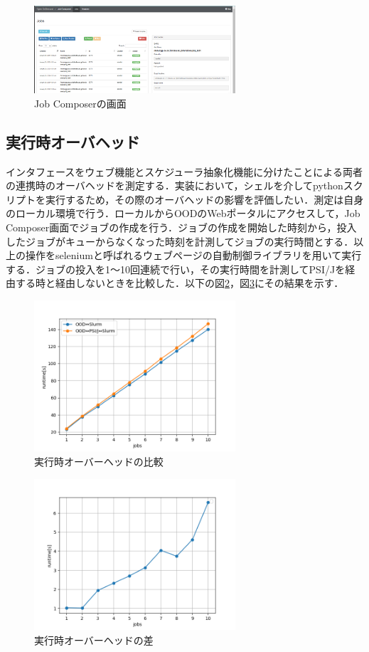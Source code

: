 \documentclass[a4paper,oneside,twocolumn,notitlepage,dvipdfmx]{jsarticle}
\begin{document}
\begin{figure}[h]
  \centering
  \includegraphics[width=75mm]{./fig/jobcomposer.png}
  \caption{Job Composerの画面}
  \label{fig4}
\end{figure}

\subsection{実行時オーバヘッド}
インタフェースをウェブ機能とスケジューラ抽象化機能に分けたことによる両者の連携時のオーバヘッドを測定する．実装において，シェルを介してpythonスクリプトを実行するため，その際のオーバヘッドの影響を評価したい．測定は自身のローカル環境で行う．ローカルからOODのWebポータルにアクセスして，Job Composer画面でジョブの作成を行う．ジョブの作成を開始した時刻から，投入したジョブがキューからなくなった時刻を計測してジョブの実行時間とする．以上の操作をseleniumと呼ばれるウェブページの自動制御ライブラリを用いて実行する．ジョブの投入を1～10回連続で行い，その実行時間を計測してPSI/Jを経由する時と経由しないときを比較した．以下の図\ref{fig2}，図\ref{fig3}にその結果を示す．\par

\begin{figure}[h]
  \centering
  \includegraphics[width=75mm]{./fig/ave_1-20.png}
  \caption{実行時オーバーヘッドの比較}
  \label{fig2}
\end{figure}

\begin{figure}[h]
  \centering
  \includegraphics[width=75mm]{./fig/ave_diff_1-20.png}
  \caption{実行時オーバーヘッドの差}
  \label{fig3}
\end{figure}
\end{document}
